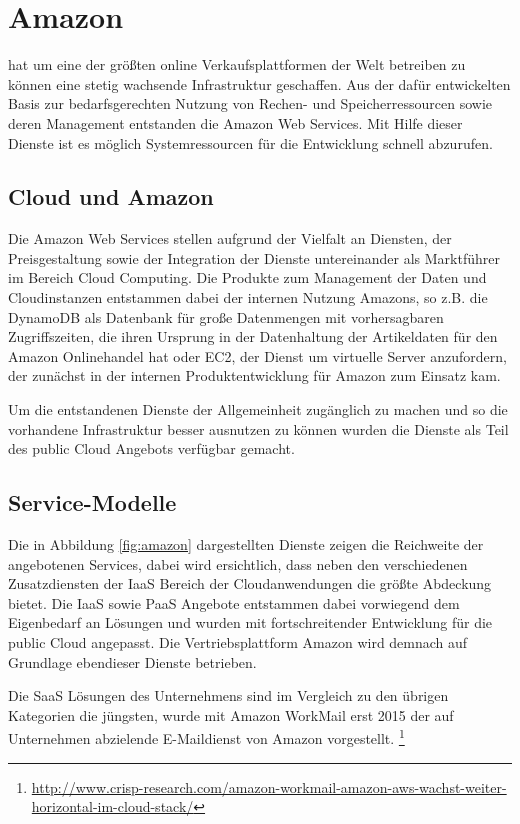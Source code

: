 \section{Amazon}
\label{sec_amazon}

 hat um eine der größten online Verkaufsplattformen der Welt betreiben zu können eine stetig wachsende Infrastruktur geschaffen. Aus der dafür entwickelten Basis zur bedarfsgerechten Nutzung von Rechen- und Speicherressourcen sowie deren Management entstanden die Amazon Web Services. Mit Hilfe dieser Dienste ist es möglich Systemressourcen für die Entwicklung schnell abzurufen.

\subsection{Cloud und Amazon}
\label{sec_amazon_general}
Die Amazon Web Services stellen aufgrund der Vielfalt an Diensten, der Preisgestaltung sowie der Integration der Dienste untereinander als Marktführer im Bereich Cloud Computing. Die Produkte zum Management der Daten und Cloudinstanzen entstammen dabei der internen Nutzung Amazons, so z.B. die DynamoDB als Datenbank für große Datenmengen mit vorhersagbaren Zugriffszeiten, die ihren Ursprung in der Datenhaltung der Artikeldaten für den Amazon Onlinehandel hat oder EC2, der Dienst um virtuelle Server anzufordern, der zunächst in der internen Produktentwicklung für Amazon zum Einsatz kam. \cite{dynamo}

Um die entstandenen Dienste der Allgemeinheit zugänglich zu machen und so die vorhandene Infrastruktur besser ausnutzen zu können wurden die Dienste als Teil des public Cloud Angebots verfügbar gemacht.

\subsection{Service-Modelle}
\label{sec_amazon_delivery}
Die in Abbildung \ref{fig:amazon} dargestellten Dienste zeigen die Reichweite der angebotenen Services, dabei wird ersichtlich, dass neben den verschiedenen Zusatzdiensten der IaaS Bereich der Cloudanwendungen die größte Abdeckung bietet. Die IaaS sowie PaaS Angebote entstammen dabei vorwiegend dem Eigenbedarf an Lösungen und wurden mit fortschreitender Entwicklung für die public Cloud angepasst. Die Vertriebsplattform Amazon wird demnach auf Grundlage ebendieser Dienste betrieben. \cite{dynamo}

Die SaaS Lösungen des Unternehmens sind im Vergleich zu den übrigen Kategorien die jüngsten, wurde mit Amazon WorkMail erst 2015 der auf Unternehmen abzielende E-Maildienst von Amazon vorgestellt. \footnote{\url{http://www.crisp-research.com/amazon-workmail-amazon-aws-wachst-weiter-horizontal-im-cloud-stack/}}

